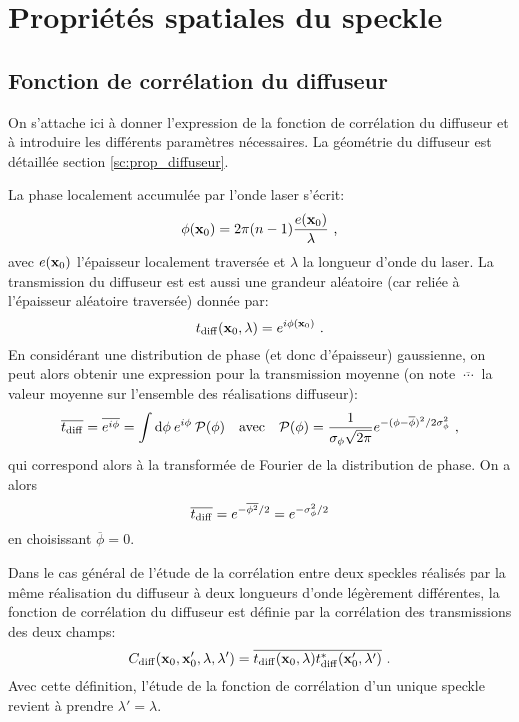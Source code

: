 \chapter{Propriétés spatiales du speckle}
\label{ch:anex_speckle}


\section{Fonction de corrélation du diffuseur}
On s'attache ici à donner l'expression de la fonction de corrélation du diffuseur et à introduire les différents paramètres nécessaires. La géométrie du diffuseur est détaillée section \ref{sc:prop_diffuseur}.

La phase localement accumulée par l'onde laser s'écrit:
\begin{equation}
\phi(\mathbf{x}_0)=2\pi (n-1) \frac{e(\mathbf{x}_0)}{\lambda} \text{ ,}
\end{equation}
avec $e(\mathbf{x}_0)$ l'épaisseur localement traversée et $\lambda$ la longueur d'onde du laser. La transmission du diffuseur est est aussi une grandeur aléatoire (car reliée à l'épaisseur aléatoire traversée) donnée par:
\begin{equation}
t_{\mathrm{diff}}(\mathbf{x}_0,\lambda)=e^{i \phi(\mathbf{x}_0)} \text{ .}
\end{equation}
En considérant une distribution de phase (et donc d'épaisseur) gaussienne, on peut alors obtenir une expression pour la transmission moyenne (on note $\overline{\:\cdots\:}$ la valeur moyenne sur l'ensemble des réalisations diffuseur):
\begin{equation}
\overline{t_{\mathrm{diff}}}= \overline{e^{i \phi}} = \int{ \mathrm{d}\phi \: e^{i \phi} \: \mathcal{P}(\phi)} \quad \text{avec} \quad \mathcal{P}(\phi) = \frac{1}{\sigma_{\phi} \sqrt{2 \pi}} e^{-(\phi - \overline{\phi})^2 /2 \sigma_{\phi}^2} \text{ ,}
\end{equation}
qui correspond alors à la transformée de Fourier de la distribution de phase. On a alors
\begin{equation}
\overline{t_{\mathrm{diff}}} = e^{-\overline{\phi^2}/2} = e^{-\sigma_{\phi}^2/2}
\end{equation}
en choisissant $\overline{\phi}=0$. 

Dans le cas général de l'étude de la corrélation entre deux speckles réalisés par la même réalisation du diffuseur à deux longueurs d'onde légèrement différentes, la fonction de corrélation du diffuseur est définie par la corrélation des transmissions des deux champs:
\begin{equation}
C_{\mathrm{diff}}(\mathbf{x}_0,\mathbf{x}_0',\lambda,\lambda')=\overline{t_{\mathrm{diff}}(\mathbf{x}_0,\lambda)t_{\mathrm{diff}}^*(\mathbf{x}_0',\lambda')} \text{ .}
\end{equation}
Avec cette définition, l'étude de la fonction de corrélation d'un unique speckle revient à prendre $\lambda'=\lambda$. 

